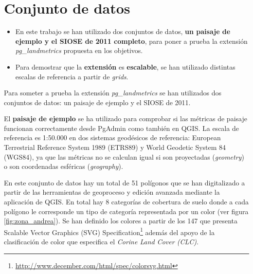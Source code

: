 \section{Conjunto de datos}

\begin{graybox}
\begin{itemize}
\item En este trabajo se han utilizado dos conjuntos de datos, \textbf{un paisaje de ejemplo y el SIOSE de 2011 completo}, para poner a prueba la extensión \textit{pg\_landmetrics} propuesta en los objetivos.
\item Para demostrar que la \textbf{extensión} es \textbf{escalable}, se han utilizado distintas escalas de referencia a partir de \textit{grids}.
\end{itemize}
\end{graybox}

Para someter a prueba la extensión \textit{pg\_landmetrics} se han utilizados dos conjuntos de datos: un paisaje de ejemplo y el SIOSE de 2011.

El \textbf{paisaje de ejemplo} se ha utilizado para comprobar si las métricas de paisaje funcionan correctamente desde PgAdmin como también en QGIS. La escala de referencia es 1:50.000 en dos sistemas geodésicos de referencia: European Terrestrial Reference System 1989 (ETRS89) y World Geodetic System 84 (WGS84), ya que las métricas no se calculan igual si son proyectadas (\textit{geometry}) o son coordenadas esféricas (\textit{geography}). 

En este conjunto de datos hay un total de 51 polígonos que se han digitalizado a partir de las herramientas de geoproceso y edición avanzada mediante la aplicación de QGIS. En total hay 8 categorías de cobertura de suelo donde a cada polígono le corresponde un tipo de categoría representada por un color (ver figura \ref{fig:zona_andrea}). Se han definido los colores a partir de los 147 que presenta Scalable Vector Graphics (SVG) Specification\footnote{\url{http://www.december.com/html/spec/colorsvg.html}} además del apoyo de la clasificación de color que especifica el \textit{Corine Land Cover (CLC)}.

